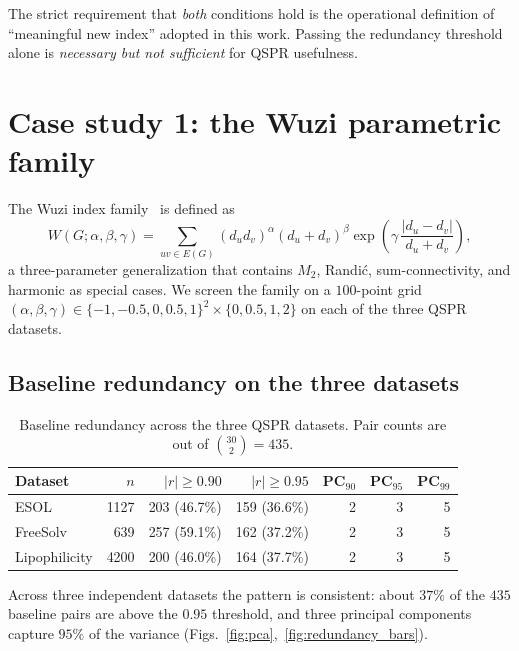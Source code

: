 \documentclass[11pt,a4paper]{article}
\theoremstyle{definition}
\begin{document}
The strict requirement that \emph{both} conditions hold is the
operational definition of ``meaningful new index'' adopted in this
work. Passing the redundancy threshold alone is \emph{necessary
but not sufficient} for QSPR usefulness.

\section{Case study 1: the Wuzi parametric family}\label{sec:wuzi_case}

The Wuzi index family~\cite{Paper2_Wuzi} is defined as
\[
W(G;\alpha,\beta,\gamma)=\sum_{uv\in E(G)}
(d_u d_v)^\alpha(d_u+d_v)^\beta
\exp\!\left(\gamma\,\frac{|d_u-d_v|}{d_u+d_v}\right),
\]
a three-parameter generalization that contains $M_2$, Randi\'c,
sum-connectivity, and harmonic as special cases. We screen the
family on a $100$-point grid
$(\alpha,\beta,\gamma)\in\{-1,-0.5,0,0.5,1\}^2\times\{0,0.5,1,2\}$
on each of the three QSPR datasets.

\subsection{Baseline redundancy on the three datasets}

\begin{table}[h]
\centering
\caption{Baseline redundancy across the three QSPR datasets. Pair counts are out of $\binom{30}{2}=435$.}
\label{tab:baseline_redundancy}
\begin{tabular}{lrrrrrr}
\toprule
Dataset & $n$ & $|r|\ge 0.90$ & $|r|\ge 0.95$ & PC$_{90}$ & PC$_{95}$ & PC$_{99}$\\
\midrule
ESOL          & 1127 & 203 (46.7\%) & 159 (36.6\%) & 2 & 3 & 5\\
FreeSolv      &  639 & 257 (59.1\%) & 162 (37.2\%) & 2 & 3 & 5\\
Lipophilicity & 4200 & 200 (46.0\%) & 164 (37.7\%) & 2 & 3 & 5\\
\bottomrule
\end{tabular}
\end{table}

Across three independent datasets the pattern is consistent: about
$37\%$ of the $435$ baseline pairs are above the $0.95$ threshold,
and three principal components capture $95\%$ of the variance
(Figs.~\ref{fig:pca},~\ref{fig:redundancy_bars}).
\end{document}
